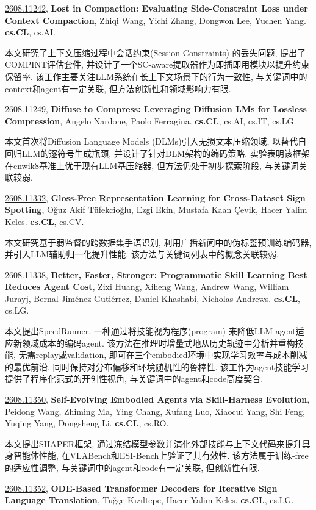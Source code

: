 \documentclass[9pt, a4paper]{article}
\theoremstyle{plain}
\theoremstyle{definition}
\theoremstyle{remark}
\newcommand{\arxivwithtarget}[3]{\hypertarget{#1}{}\href{https://arxiv.org/abs/#1}{#1}, \textbf{\textcolor{arxivblue}{#2}}, #3. }
\begin{document}
\arxivwithtarget{2608.11242}{Lost in Compaction: Evaluating Side-Constraint Loss under Context Compaction}{Zhiqi Wang, Yichi Zhang, Dongwon Lee, Yuchen Yang}\textbf{cs.CL}, cs.AI.

本文研究了上下文压缩过程中会话约束(Session Constraints) 的丢失问题, 提出了COMPINT评估套件, 并设计了一个SC-aware提取器作为即插即用模块以提升约束保留率. 该工作主要关注LLM系统在长上下文场景下的行为一致性, 与关键词中的context和agent有一定关联, 但方法创新性和领域影响力有限.


\arxivwithtarget{2608.11249}{Diffuse to Compress: Leveraging Diffusion LMs for Lossless Compression}{Angelo Nardone, Paolo Ferragina}\textbf{cs.CL}, cs.AI, cs.IT, cs.LG.

本文首次将Diffusion Language Models (DLMs)引入无损文本压缩领域, 以替代自回归LLM的逐符号生成瓶颈, 并设计了针对DLM架构的编码策略. 实验表明该框架在enwik8基准上优于现有LLM基压缩器, 但方法仍处于初步探索阶段, 与关键词关联较弱.


\arxivwithtarget{2608.11332}{Gloss-Free Representation Learning for Cross-Dataset Sign Spotting}{Oğuz Akif Tüfekcioğlu, Ezgi Ekin, Mustafa Kaan Çevik, Hacer Yalim Keles}\textbf{cs.CL}, cs.CV.

本文研究基于弱监督的跨数据集手语识别, 利用广播新闻中的伪标签预训练编码器, 并引入LLM辅助归一化提升性能. 该方法与关键词列表中的概念关联较弱.


\arxivwithtarget{2608.11338}{Better, Faster, Stronger: Programmatic Skill Learning Best Reduces Agent Cost}{Zixi Huang, Xiheng Wang, Andrew Wang, William Jurayj, Bernal Jiménez Gutiérrez, Daniel Khashabi, Nicholas Andrews}\textbf{cs.CL}, cs.LG.

本文提出SpeedRunner, 一种通过将技能视为程序(program) 来降低LLM agent适应新领域成本的编码agent. 该方法在推理时增量式地从历史轨迹中分析并重构技能, 无需replay或validation, 即可在三个embodied环境中实现学习效率与成本削减的最优前沿, 同时保持对分布偏移和环境随机性的鲁棒性. 该工作为agent技能学习提供了程序化范式的开创性视角, 与关键词中的agent和code高度契合.


\arxivwithtarget{2608.11350}{Self-Evolving Embodied Agents via Skill-Harness Evolution}{Peidong Wang, Zhiming Ma, Ying Chang, Xufang Luo, Xiaocui Yang, Shi Feng, Yuqing Yang, Dongsheng Li}\textbf{cs.CL}, cs.RO.

本文提出SHAPER框架, 通过冻结模型参数并演化外部技能与上下文代码来提升具身智能体性能, 在VLABench和ESI-Bench上验证了其有效性. 该方法属于训练-free的适应性调整, 与关键词中的agent和code有一定关联, 但创新性有限.


\arxivwithtarget{2608.11352}{ODE-Based Transformer Decoders for Iterative Sign Language Translation}{Tuğçe Kızıltepe, Hacer Yalim Keles}\textbf{cs.CL}, cs.LG.
\end{document}

